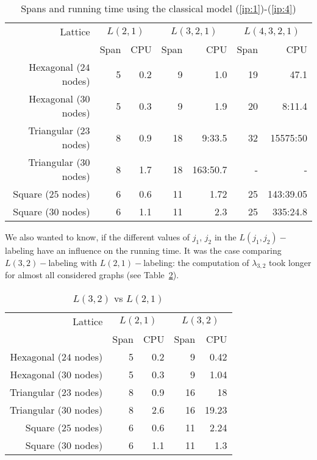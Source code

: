 \documentclass[smallextended]{svjour3}
\begin{document}
\begin{table}[h] 
\centering 

\begin{tabular}{|r||r|r|r|r|r|r|} 
\hline 
Lattice  & \multicolumn{2}{c|}{$L(2,1)$} & \multicolumn{2}{c|}{$L(3,2,1)$} & \multicolumn{2}{c|}{$L(4,3,2,1)$} \\ 
         & Span & CPU & Span & CPU & Span & CPU  \\ 
\hline 
Hexagonal ($24$ nodes)  & 5 & 0.2 & 9 & 1.0 & 19 & 47.1  \\ 
\hline 
Hexagonal ($30$ nodes)  & 5 & 0.3 & 9 & 1.9 & 20 & 8:11.4  \\ 
\hline 
Triangular ($23$ nodes) & 8 & 0.9 & 18 & 9:33.5 & 32 & 15575:50  \\ 
\hline 
Triangular ($30$ nodes) & 8 & 1.7 & 18 & 163:50.7 & - & -      \\ 
\hline 
Square ($25$ nodes)    & 6 & 0.6 & 11 & 1.72 & 25 & 143:39.05  \\ 
\hline 
Square ($30$ nodes)    & 6 & 1.1 & 11 & 2.3 & 25 & 335:24.8      \\ 
\hline 
\end{tabular} 
\caption{ Spans and running time using the classical model (\ref{ip:1})-(\ref{ip:4})} 
\label{tab:00} 
\end{table} 

We also wanted to know, if the different values of $j_1$, $j_2$ in the $L(j_1,j_2)-$labeling have an influence on the running time. It was the case comparing $L(3,2)-$labeling with $L(2,1)-$labeling: the computation of $\lambda_{3,2}$ took longer for almost all considered graphs (see Table~\ref{tab:01}). 
 

\begin{table}[h] 
\centering 
\begin{tabular}{|r||r|r|r|r|} 
\hline 
Lattice  & \multicolumn{2}{c|}{$L(2,1)$} & \multicolumn{2}{c|}{$L(3,2)$}\\ 
         & Span & CPU & Span & CPU\\ 
\hline 
Hexagonal ($24$ nodes)  & 5 & 0.2 & 9 & 0.42 \\ 
\hline 
Hexagonal ($30$ nodes)  & 5 & 0.3 & 9 & 1.04 \\ 
\hline 
Triangular ($23$ nodes) & 8 & 0.9 & 16 & 18 \\ 
\hline 
Triangular ($30$ nodes) & 8 & 2.6 & 16 & 19.23 \\ 
\hline 
Square ($25$ nodes)    & 6 & 0.6 & 11 & 2.24 \\ 
\hline 
Square ($30$ nodes)  & 6 & 1.1 & 11 & 1.3 \\ 
\hline 
\end{tabular} 
\caption{$L(3,2)$ vs $L(2,1)$} 
\label{tab:01} 
\end{table} 
\end{document}
